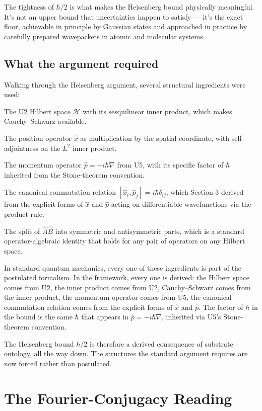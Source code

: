 \documentclass[11pt,a4paper]{article}
\begin{document}
The tightness of $\hbar/2$ is what makes the Heisenberg bound physically meaningful. It's not an upper bound that uncertainties happen to satisfy --- it's the exact floor, achievable in principle by Gaussian states and approached in practice by carefully prepared wavepackets in atomic and molecular systems.

\subsection{What the argument required}

Walking through the Heisenberg argument, several structural ingredients were used:

The U2 Hilbert space $\mathcal{H}$ with its sesquilinear inner product, which makes Cauchy--Schwarz available.

The position operator $\hat{x}$ as multiplication by the spatial coordinate, with self-adjointness on the $L^2$ inner product.

The momentum operator $\hat{p} = -i\hbar\nabla$ from U5, with its specific factor of $\hbar$ inherited from the Stone-theorem convention.

The canonical commutation relation $[\hat{x}_i, \hat{p}_j] = i\hbar\delta_{ij}$, which Section 3 derived from the explicit forms of $\hat{x}$ and $\hat{p}$ acting on differentiable wavefunctions via the product rule.

The split of $\hat{A}\hat{B}$ into symmetric and antisymmetric parts, which is a standard operator-algebraic identity that holds for any pair of operators on any Hilbert space.

In standard quantum mechanics, every one of these ingredients is part of the postulated formalism. In the framework, every one is derived: the Hilbert space comes from U2, the inner product comes from U2, Cauchy--Schwarz comes from the inner product, the momentum operator comes from U5, the canonical commutation relation comes from the explicit forms of $\hat{x}$ and $\hat{p}$. The factor of $\hbar$ in the bound is the same $\hbar$ that appears in $\hat{p} = -i\hbar\nabla$, inherited via U5's Stone-theorem convention.

The Heisenberg bound $\hbar/2$ is therefore a derived consequence of substrate ontology, all the way down. The structures the standard argument requires are now forced rather than postulated.

\section{The Fourier-Conjugacy Reading}
\end{document}
